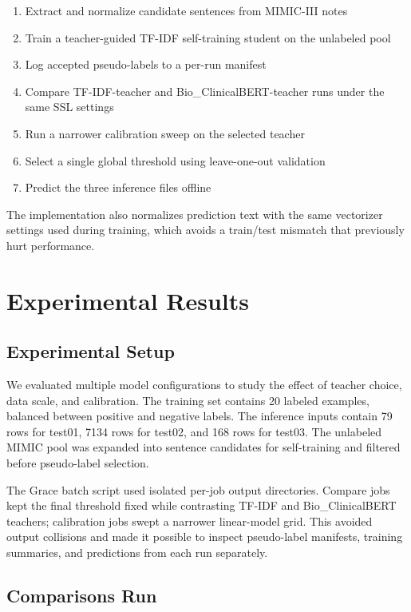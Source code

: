 \documentclass[journal]{IEEEtran}
\begin{document}
\begin{enumerate}
    \item Extract and normalize candidate sentences from MIMIC-III notes
    \item Train a teacher-guided TF-IDF self-training student on the unlabeled pool
    \item Log accepted pseudo-labels to a per-run manifest
    \item Compare TF-IDF-teacher and Bio\_ClinicalBERT-teacher runs under the same SSL settings
    \item Run a narrower calibration sweep on the selected teacher
    \item Select a single global threshold using leave-one-out validation
    \item Predict the three inference files offline
\end{enumerate}

The implementation also normalizes prediction text with the same vectorizer settings used during training, which avoids a train/test mismatch that previously hurt performance.

\section{Experimental Results}

\subsection{Experimental Setup}

We evaluated multiple model configurations to study the effect of teacher choice, data scale, and calibration. The training set contains 20 labeled examples, balanced between positive and negative labels. The inference inputs contain 79 rows for test01, 7134 rows for test02, and 168 rows for test03. The unlabeled MIMIC pool was expanded into sentence candidates for self-training and filtered before pseudo-label selection.

The Grace batch script used isolated per-job output directories. Compare jobs kept the final threshold fixed while contrasting TF-IDF and Bio\_ClinicalBERT teachers; calibration jobs swept a narrower linear-model grid. This avoided output collisions and made it possible to inspect pseudo-label manifests, training summaries, and predictions from each run separately.

\subsection{Comparisons Run}
\end{document}

